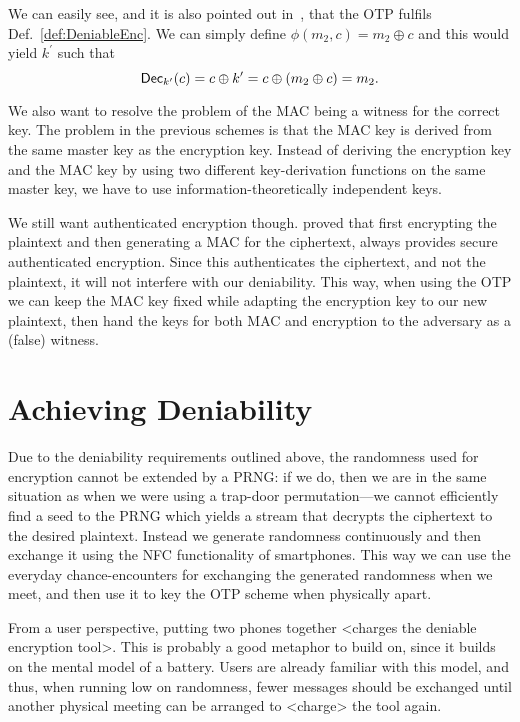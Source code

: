 We can easily see, and it is also pointed out in~\cite{deniablecrypt}, that the 
\ac{OTP} fulfils Def.~\ref{def:DeniableEnc}.
We can simply define \(\phi( m_2, c ) = m_2\oplus c\) and this would yield 
\(k^\prime\) such that \[
  \operatorname{\mathsf{Dec}}_{k^\prime}( c ) = c\oplus k^\prime = c\oplus ( m_2\oplus c ) = m_2.
\]

We also want to resolve the problem of the \ac{MAC} being a witness for the 
correct key.
The problem in the previous schemes is that the \ac{MAC} key is derived from 
the same master key as the encryption key.
Instead of deriving the encryption key and the \ac{MAC} key by using two 
different key-derivation functions on the same master key, we have to use 
information-theoretically independent keys.

We still want authenticated encryption though.
\citet{AuthEncJournal} proved that first encrypting the plaintext and then 
generating a \ac{MAC} for the ciphertext, always provides secure authenticated 
encryption.
Since this authenticates the ciphertext, and not the plaintext, it will not 
interfere with our deniability.
This way, when using the \ac{OTP} we can keep the \ac{MAC} key fixed while 
adapting the encryption key to our new plaintext, then hand the keys for both 
\ac{MAC} and encryption to the adversary as a (false) witness.


\section{Achieving Deniability}
\label{sec:otp-kx}

Due to the deniability requirements outlined above, the randomness used for 
encryption cannot be extended by a \ac{PRNG}: if we do, then we are in the same 
situation as when we were using a trap-door permutation---we cannot efficiently 
find a seed to the \ac{PRNG} which yields a stream that decrypts the ciphertext 
to the desired plaintext.
Instead we generate randomness continuously and then exchange it using the 
\ac{NFC} functionality of smartphones.
This way we can use the everyday chance-encounters for exchanging the generated 
randomness when we meet, and then use it to key the \ac{OTP} scheme when 
physically apart.

From a user perspective, putting two phones together <charges the deniable 
encryption tool>.
This is probably a good metaphor to build on, since it builds on the mental 
model of a battery.
Users are already familiar with this model, and thus, when running low on 
randomness, fewer messages should be exchanged until another physical meeting 
can be arranged to <charge> the tool again.

